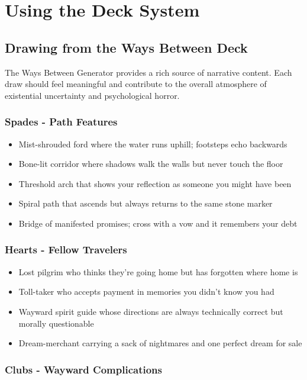 \documentclass[11pt]{article}
\begin{document}
\section{Using the Deck System}

\subsection{Drawing from the Ways Between Deck}

The Ways Between Generator provides a rich source of narrative content. Each draw should feel meaningful and contribute to the overall atmosphere of existential uncertainty and psychological horror.

\subsubsection{Spades - Path Features}

\begin{itemize}
\item Mist-shrouded ford where the water runs uphill; footsteps echo backwards
\item Bone-lit corridor where shadows walk the walls but never touch the floor
\item Threshold arch that shows your reflection as someone you might have been
\item Spiral path that ascends but always returns to the same stone marker
\item Bridge of manifested promises; cross with a vow and it remembers your debt
\end{itemize}

\subsubsection{Hearts - Fellow Travelers}

\begin{itemize}
\item Lost pilgrim who thinks they're going home but has forgotten where home is
\item Toll-taker who accepts payment in memories you didn't know you had
\item Wayward spirit guide whose directions are always technically correct but morally questionable
\item Dream-merchant carrying a sack of nightmares and one perfect dream for sale
\end{itemize}

\subsubsection{Clubs - Wayward Complications}
\end{document}
